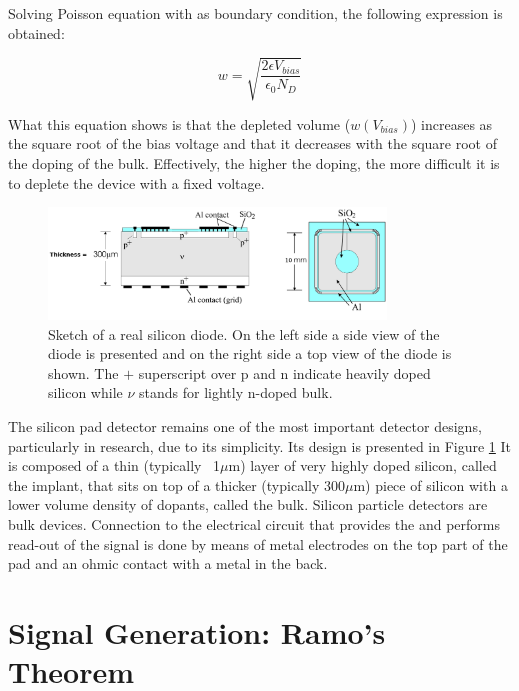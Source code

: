 Solving Poisson equation with \vias as boundary condition, the following
expression is obtained: 

\begin{equation}
w = \sqrt{\frac{2\epsilon V_{bias}}{\epsilon_0 N_D}}
\label{eq:widthVias}
\end{equation}

What this equation shows is that the depleted volume ($w(V_{bias})$) increases as the square
root of the bias voltage and that it decreases with the square root of the doping of the
bulk. Effectively, the higher the doping, the more difficult it is to deplete the
device with a fixed voltage. 

\begin{figure}[H]
	\centering
	\includegraphics[width=0.8\textwidth]{diode_si.png}
	\caption{Sketch of a real silicon diode. On the left side a side view of the diode is presented and on the right side a top view of the diode is shown. The $+$ superscript over p and n indicate heavily doped silicon while $\nu$ stands for lightly n-doped bulk.}
	\label{fig:diodeSi}
\end{figure}

The silicon pad detector remains one of the most important detector designs,
particularly in research, due to its simplicity. Its design is presented in Figure \ref{fig:diodeSi} It is composed of a thin
(typically ~1$\mu$m) layer of very highly doped silicon, called the implant,
that sits on top of a thicker (typically 300$\mu$m) piece of silicon with a
lower volume density of dopants, called the bulk. Silicon particle detectors are
bulk devices. Connection to the electrical circuit that provides the \vias and
performs read-out of the signal is done by means of metal electrodes on the top
part of the pad and an ohmic contact with a metal in the back. 

\section{Signal Generation: Ramo's Theorem} %
\label{sec:Ramo}

